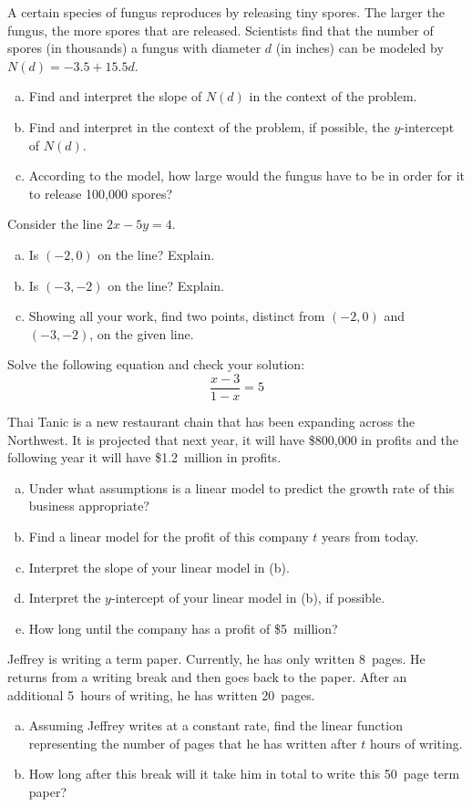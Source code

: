 \documentclass[11pt,letterpaper]{article}
\begin{document}
	
\prob A certain species of fungus reproduces by releasing tiny spores. The larger the fungus, the more spores that are released. Scientists find that the number of spores (in thousands) a fungus with diameter $d$ (in inches) can be modeled by $N(d)= -3.5 + 15.5d$.
	\begin{enumerate}[(a)]
	\item Find and interpret the slope of $N(d)$ in the context of the problem.
	\item Find and interpret in the context of the problem, if possible, the $y$-intercept of $N(d)$.
	\item According to the model, how large would the fungus have to be in order for it to release 100,000 spores?
	\end{enumerate} \pspace	
	

\prob	 Consider the line $2x - 5y= 4$.
	\begin{enumerate}[(a)]
	\item Is $(-2, 0)$ on the line? Explain.
	\item Is $(-3, -2)$ on the line? Explain.
	\item Showing all your work, find two points, distinct from $(-2, 0)$ and $(-3, -2)$, on the given line. 
	\end{enumerate} \pspace


\prob Solve the following equation and check your solution:
	\[
	\dfrac{x - 3}{1 - x}= 5
	\] \pspace
	
	
\prob Thai Tanic is a new restaurant chain that has been expanding across the Northwest. It is projected that next year, it will have \$800,000 in profits and the following year it will have \$1.2~million in profits. 
	\begin{enumerate}[(a)]
	\item Under what assumptions is a linear model to predict the growth rate of this business appropriate?
	\item Find a linear model for the profit of this company $t$ years from today. 
	\item Interpret the slope of your linear model in (b).
	\item Interpret the $y$-intercept of your linear model in (b), if possible. 
	\item How long until the company has a profit of \$5~million? 
	\end{enumerate} \pspace		
	
	
\prob Jeffrey is writing a term paper. Currently, he has only written 8~pages. He returns from a writing break and then goes back to the paper. After an additional 5~hours of writing, he has written 20~pages. 
	\begin{enumerate}[(a)]
	\item Assuming Jeffrey writes at a constant rate, find the linear function representing the number of pages that he has written after $t$ hours of writing. 
	\item How long after this break will it take him in total to write this 50~page term paper?
	\end{enumerate} \pspace 	
\end{document}
